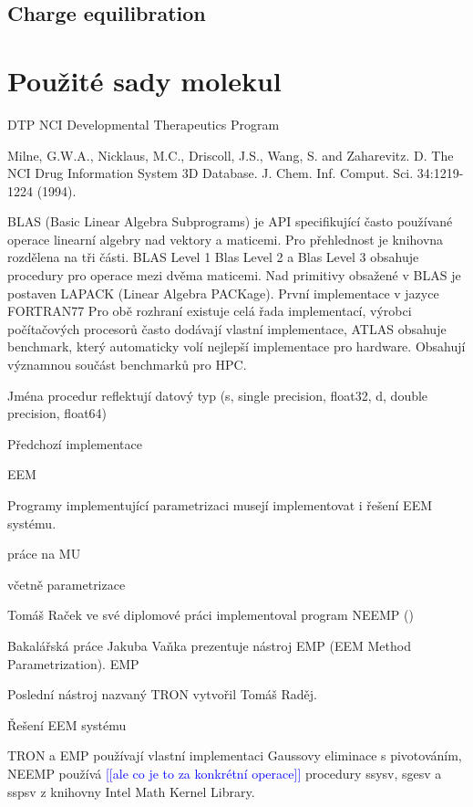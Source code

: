 \documentclass[10pt,draft,oneside]{fithesis2}
\newcommand\todo[1]{\textcolor{blue}{[[#1]]}}
\begin{document}
\section{Charge equilibration}

\chapter{Použité sady molekul}

DTP NCI Developmental Therapeutics Program


Milne, G.W.A., Nicklaus, M.C., Driscoll, J.S., Wang, S. and Zaharevitz. D. The NCI Drug Information System 3D Database. J. Chem. Inf. Comput. Sci. 34:1219-1224 (1994).


BLAS (Basic Linear Algebra Subprograms) je API specifikující často používané operace linearní algebry nad vektory a maticemi. Pro přehlednost je knihovna rozdělena na tři části. BLAS Level 1 Blas Level 2 a Blas Level 3 obsahuje procedury pro operace mezi dvěma maticemi. Nad primitivy obsažené v BLAS je postaven LAPACK (Linear Algebra PACKage). První implementace v jazyce FORTRAN77 Pro obě rozhraní existuje celá řada implementací, výrobci počítačových procesorů často dodávají vlastní implementace, ATLAS obsahuje benchmark, který automaticky volí nejlepší implementace pro hardware. Obsahují významnou součást benchmarků pro HPC.

Jména procedur reflektují datový typ (s, single precision, float32, d, double precision, float64)



Předchozí implementace

EEM

Programy implementující parametrizaci musejí implementovat i řešení EEM systému.

práce na MU

včetně parametrizace

Tomáš Raček ve své diplomové práci implementoval program NEEMP ()

Bakalářská práce Jakuba Vaňka prezentuje nástroj EMP (EEM Method Parametrization). EMP 

Poslední nástroj nazvaný TRON vytvořil Tomáš Raděj.

Řešení EEM systému

TRON a EMP používají vlastní implementaci Gaussovy eliminace s pivotováním, NEEMP používá \todo{ale co je to za konkrétní operace} procedury ssysv, sgesv a sspsv  z knihovny Intel Math Kernel Library.
\end{document}
